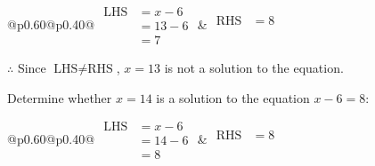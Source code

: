 \documentclass[12pt]{article}
\newcounter{minipagecount}
\begin{document}
\begin{multicols}{2}
\begin{minipage}[t]{0.40\textwidth}
    \noindent
    \renewcommand{\arraystretch}{1.3} %
    \begin{tabular}{@{}p{0.60\linewidth}@{}p{0.40\linewidth}@{}}
        \(\begin{aligned}
            \text{LHS} &= x - 6 \\
                    &= 13 - 6 \\
                    &= 7
        \end{aligned}\) &
        \(\begin{aligned}
            \text{RHS} &= 8\\
                    & \\
                    &
        \end{aligned}\)
    \end{tabular}
    \renewcommand{\arraystretch}{1.0} %
    \vspace{2pt}  %

    \noindent \(\therefore\) Since \(\text{LHS} \neq \text{RHS}\), \(x = 13\) is not  a solution to the equation.

\end{minipage}

 \vspace*{16pt}
\noindent{(\theminipagecount)}\hspace{0.1mm} %
\begin{minipage}[t]{0.40\textwidth} %

    \noindent Determine whether \(x = 14\) is a solution to the equation \(x - 6 = 8\):
    \vspace{4pt}  %

    \noindent
    \renewcommand{\arraystretch}{1.3} %
    \begin{tabular}{@{}p{0.60\linewidth}@{}p{0.40\linewidth}@{}}
        \(\begin{aligned}
            \text{LHS} &= x - 6 \\
                    &= 14 - 6 \\
                    &= 8
        \end{aligned}\) &
        \(\begin{aligned}
            \text{RHS} &= 8\\
                    & \\
                    &
        \end{aligned}\)
    \end{tabular}
    \renewcommand{\arraystretch}{1.0} %
    \vspace{2pt}  %


\end{minipage}
\end{multicols}
\end{document}
